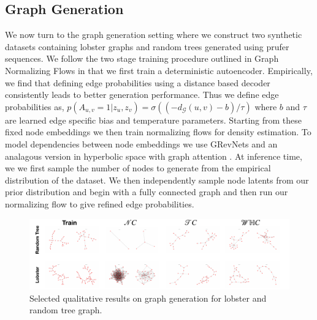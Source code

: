 \subsection{Graph Generation}
We now turn to the graph generation setting where we construct two synthetic datasets containing lobster graphs and random trees generated using prufer sequences. We follow the two stage training procedure outlined in Graph Normalizing Flows \cite{liu2019graph} in that we first train a deterministic autoencoder. Empirically, we find that defining edge probabilities using a distance based decoder consistently leads to better generation performance. Thus we define edge probabilities as, $p(A_{u,v}=1|z_u,z_v) = \sigma((-d_{\mathcal{G}}(u,v) - b)/\tau)$ where $b$ and $\tau$ are learned edge specific bias and temperature parameters. Starting from these fixed node embeddings we then train normalizing flows for density estimation. To model dependencies between node embeddings we use GRevNets \cite{liu2019graph} and an analagous version in hyperbolic space with graph attention \cite{velivckovic2017graph}. At inference time, we we first sample the number of nodes to generate from the empirical distribution of the dataset. We then independently sample node latents from our prior distribution and begin with a fully connected graph and then run our normalizing flow to give refined edge probabilities. 

\begin{figure}
    \centering
    \includegraphics[width=\textwidth]{hyperbolic_graph_gen.pdf}
    \vspace{-5mm}
    \caption{Selected qualitative results on graph generation for lobster and random tree graph.}
    \label{fig:graph_generation_pic}
\end{figure}

